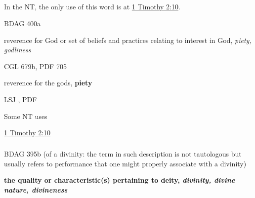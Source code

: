 			\subparagraph{\texorpdfstring{}{}}
				\label{THEOSEBEIA}
				
				In the NT, the only use of this word is at \hyperref[1TIMOTHY-2-10]{1 Timothy 2:10}.
			
				\begin{compactdesc}
					\item[BDAG 400a] \textbf{}
						\begin{compactitem}
							\item reverence for God or set of beliefs and practices relating to interest in God, \textit{piety, godliness}
						\end{compactitem}
					\item[CGL 679b, PDF 705] \textbf{}
						\begin{compactitem}
							\item reverence for the gods, \textbf{piety}
						\end{compactitem}
					\item[LSJ , PDF ] \textbf{}
						\begin{compactitem}
							\item 
						\end{compactitem}
				\end{compactdesc}
				
				\begin{compactdesc}
					\item[Some NT uses] \textbf{}
						\begin{compactdesc}
							\item[{\hyperref[1TIMOTHY-2-10]{1 Timothy 2:10}}]
						\end{compactdesc}
				\end{compactdesc}
				
			\subparagraph{\texorpdfstring{\gr{θειότης}}{}}
				\label{THEIOTES}
			
				\begin{compactdesc}
					\item[BDAG 395b] (of a divinity: the term in such description is not tautologous but usually refers to performance that one might properly associate with a divinity)
						\begin{compactitem}
							\item \textbf{the quality or characteristic(s) pertaining to deity, \textit{divinity, divine nature, divineness}}
						\end{compactitem}
				\end{compactdesc}
				
